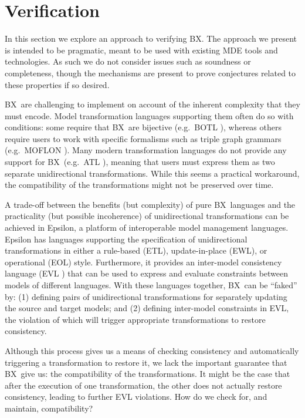 \section{Verification}
\label{section:verification}

\newcommand{\BX}{BX}

In this section we explore an approach to verifying BX. The approach we present is intended to be pragmatic, meant to be used with existing MDE tools and technologies. As such we do not consider issues such as soundness or completeness, though the mechanisms are present to prove conjectures related to these properties if so desired.

\BX\ are challenging to implement on account of the inherent complexity that they must encode. Model transformation languages supporting them often do so with conditions: some require that \BX\ are bijective (e.g.\ BOTL \cite{Braun-Marschall03a}), whereas others require users to work with specific formalisms such as triple graph grammars (e.g.\ MOFLON \cite{AKRS06a}).  Many modern transformation languages do not provide any support for \BX\ (e.g.\ ATL \cite{JABK08a}), meaning that users must express them as two separate unidirectional transformations. While this seems a practical workaround, the compatibility of the transformations might not be preserved over time.
	
A trade-off between the benefits (but complexity) of pure \BX\ languages and the practicality (but possible incoherence) of unidirectional transformations can be achieved in Epsilon, a platform of interoperable model management languages. Epsilon has languages supporting the specification of unidirectional transformations in either a rule-based (ETL), update-in-place (EWL), or operational (EOL) \cite{Paige-KRDP09a} style. Furthermore, it provides an inter-model consistency language (EVL \cite{Kolovos-Paige-Polack09a}) that can be used to express and evaluate constraints between models of different languages. With these languages together, \BX\ can be ``faked'' by: (1) defining pairs of unidirectional transformations for separately updating the source and target models; and (2) defining inter-model constraints in EVL, the violation of which will trigger appropriate transformations to restore consistency.
	
Although this process gives us a means of checking consistency and automatically triggering a transformation to restore it, we lack the important guarantee that \BX\ give us: the compatibility of the transformations. It might be the case that after the execution of one transformation, the other does not actually restore consistency, leading to further EVL violations. How do we check for, and maintain, compatibility? 
	
